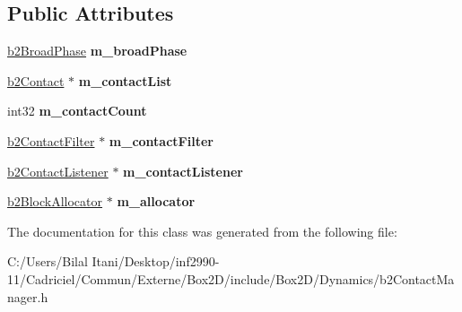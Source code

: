 \subsection*{Public Attributes}
\begin{DoxyCompactItemize}
\item 
\hyperlink{classb2_broad_phase}{b2\+Broad\+Phase} {\bfseries m\+\_\+broad\+Phase}\hypertarget{classb2_contact_manager_af85a9c7b0fb138b9fb635dbcf3b0b482}{}\label{classb2_contact_manager_af85a9c7b0fb138b9fb635dbcf3b0b482}

\item 
\hyperlink{classb2_contact}{b2\+Contact} $\ast$ {\bfseries m\+\_\+contact\+List}\hypertarget{classb2_contact_manager_aaca5f490daffabd29f7ad809921224b3}{}\label{classb2_contact_manager_aaca5f490daffabd29f7ad809921224b3}

\item 
int32 {\bfseries m\+\_\+contact\+Count}\hypertarget{classb2_contact_manager_a115b2f9bf38ffd045b26ae91ea696288}{}\label{classb2_contact_manager_a115b2f9bf38ffd045b26ae91ea696288}

\item 
\hyperlink{classb2_contact_filter}{b2\+Contact\+Filter} $\ast$ {\bfseries m\+\_\+contact\+Filter}\hypertarget{classb2_contact_manager_accf0e9232b9eeff002220ecb8d37a17f}{}\label{classb2_contact_manager_accf0e9232b9eeff002220ecb8d37a17f}

\item 
\hyperlink{classb2_contact_listener}{b2\+Contact\+Listener} $\ast$ {\bfseries m\+\_\+contact\+Listener}\hypertarget{classb2_contact_manager_ac3565501f5ab42323050712b244bfe9a}{}\label{classb2_contact_manager_ac3565501f5ab42323050712b244bfe9a}

\item 
\hyperlink{classb2_block_allocator}{b2\+Block\+Allocator} $\ast$ {\bfseries m\+\_\+allocator}\hypertarget{classb2_contact_manager_a20c57f602aa349239df715de5294821d}{}\label{classb2_contact_manager_a20c57f602aa349239df715de5294821d}

\end{DoxyCompactItemize}


The documentation for this class was generated from the following file\+:\begin{DoxyCompactItemize}
\item 
C\+:/\+Users/\+Bilal Itani/\+Desktop/inf2990-\/11/\+Cadriciel/\+Commun/\+Externe/\+Box2\+D/include/\+Box2\+D/\+Dynamics/b2\+Contact\+Manager.\+h\end{DoxyCompactItemize}
